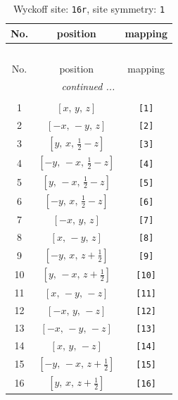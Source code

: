 \documentclass[fleqn,8pt]{jsarticle}
\begin{document}
\begin{longtable}{ccc}
\caption{Wyckoff site: {\tt 16r}, site symmetry: {\tt 1}}
 \\
 \hline \hline
No. & position & mapping \\ \hline \endfirsthead

\multicolumn{2}{l}{\tablename\ \thetable{}} \\
 \hline \hline
No. & position & mapping \\ \hline \endhead

 \hline \hline
\multicolumn{2}{r}{\footnotesize\it continued ...} \\ \endfoot

 \hline \hline
\multicolumn{2}{r}{} \\ \endlastfoot

1 & $\left[ x,\, y,\, z \right]$ & {\tt [1]} \\ \hline
2 & $\left[ - x,\, - y,\, z \right]$ & {\tt [2]} \\ \hline
3 & $\left[ y,\, x,\, \frac{1}{2} - z \right]$ & {\tt [3]} \\ \hline
4 & $\left[ - y,\, - x,\, \frac{1}{2} - z \right]$ & {\tt [4]} \\ \hline
5 & $\left[ y,\, - x,\, \frac{1}{2} - z \right]$ & {\tt [5]} \\ \hline
6 & $\left[ - y,\, x,\, \frac{1}{2} - z \right]$ & {\tt [6]} \\ \hline
7 & $\left[ - x,\, y,\, z \right]$ & {\tt [7]} \\ \hline
8 & $\left[ x,\, - y,\, z \right]$ & {\tt [8]} \\ \hline
9 & $\left[ - y,\, x,\, z + \frac{1}{2} \right]$ & {\tt [9]} \\ \hline
10 & $\left[ y,\, - x,\, z + \frac{1}{2} \right]$ & {\tt [10]} \\ \hline
11 & $\left[ x,\, - y,\, - z \right]$ & {\tt [11]} \\ \hline
12 & $\left[ - x,\, y,\, - z \right]$ & {\tt [12]} \\ \hline
13 & $\left[ - x,\, - y,\, - z \right]$ & {\tt [13]} \\ \hline
14 & $\left[ x,\, y,\, - z \right]$ & {\tt [14]} \\ \hline
15 & $\left[ - y,\, - x,\, z + \frac{1}{2} \right]$ & {\tt [15]} \\ \hline
16 & $\left[ y,\, x,\, z + \frac{1}{2} \right]$ & {\tt [16]} \\
\end{longtable}
\end{document}
